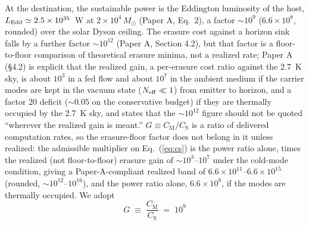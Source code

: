 \documentclass[11pt]{article}
\newcommand{\msun}{\ensuremath{M_\odot}}
\begin{document}
At the destination, the sustainable power is the Eddington luminosity of the host, $L_{\rm Edd} \simeq 2.5\times10^{35}$~W at $2\times10^{4}\,\msun$ (Paper A, Eq.~2), a factor $\sim$$10^{9}$ ($6.6\times10^{8}$, rounded) over the solar Dyson ceiling. The erasure cost against a horizon sink falls by a further factor $\sim$$10^{12}$ (Paper A, Section 4.2), but that factor is a floor-to-floor comparison of theoretical erasure minima, not a realized rate; Paper A (\S4.2) is explicit that the realized gain, a per-erasure cost ratio against the $2.7$~K sky, is about $10^{3}$ in a fed flow and about $10^{7}$ in the ambient medium if the carrier modes are kept in the vacuum state ($N_{\rm eff}\ll1$) from emitter to horizon, and a factor 20 deficit ($\sim 0.05$ on the conservative budget) if they are thermally occupied by the 2.7~K sky, and states that the $\sim$$10^{12}$ figure should not be quoted ``wherever the realized gain is meant.'' $G \equiv C_{\mathrm M}/C_{\mathrm S}$ is a ratio of delivered computation rates, so the erasure-floor factor does not belong in it unless realized: the admissible multiplier on Eq.~(\ref{eq:cs}) is the power ratio alone, times the realized (not floor-to-floor) erasure gain of $\sim 10^{3}$--$10^{7}$ under the cold-mode condition, giving a Paper-A-compliant realized band of $6.6\times10^{11}$--$6.6\times10^{15}$ (rounded, $\sim$$10^{12}$--$10^{16}$), and the power ratio alone, $6.6\times10^{8}$, if the modes are thermally occupied. We adopt
\begin{equation}
G \;\equiv\; \frac{C_{\mathrm M}}{C_{\mathrm S}} \;=\; 10^{9}
\label{eq:g}
\end{equation}
\end{document}
